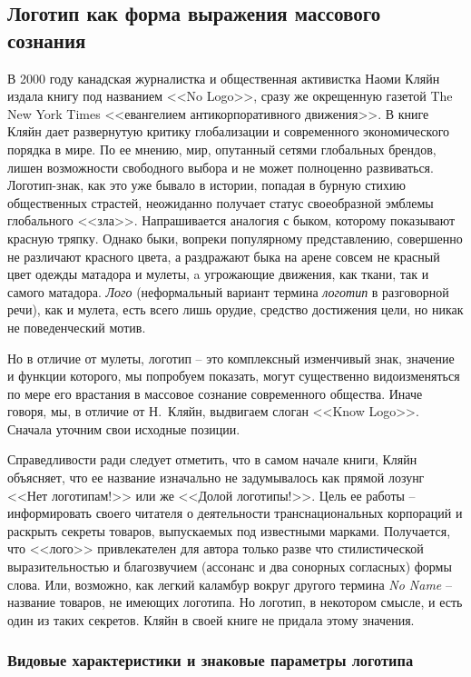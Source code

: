 \subsection{Логотип как форма выражения массового сознания}
\label{1.3}

В 2000 году канадская журналистка и общественная активистка Наоми Кляйн
издала книгу под названием <<No Logo>>, сразу же окрещенную газетой
The New York Times <<евангелием антикорпоративного движения>>. В книге Кляйн дает
развернутую критику глобализации и современного экономического порядка в мире.
По ее мнению, мир, опутанный сетями глобальных брендов, лишен возможности свободного
выбора и не может полноценно развиваться.
Логотип-знак, как это уже бывало в истории,  попадая в бурную стихию общественных
страстей, неожиданно получает статус своеобразной эмблемы глобального <<зла>>.
Напрашивается аналогия с быком, которому показывают красную тряпку. Однако быки,
вопреки популярному представлению, совершенно не различают красного цвета,
а раздражают быка на арене совсем не красный цвет одежды матадора и мулеты,
a угрожающие движения, как ткани, так и самого матадора.
\emph{Лого} (неформальный вариант термина \emph{логотип} в разговорной речи),
как и мулета, есть всего лишь орудие, средство достижения цели,
но никак не поведенческий мотив.

Но в отличие от мулеты, логотип -- это комплексный изменчивый знак, значение и
функции которого, мы попробуем показать, могут существенно видоизменяться по мере
его врастания в массовое сознание современного общества. Иначе говоря, мы, в
отличие от Н.~Кляйн, выдвигаем слоган <<Know Logo>>. Сначала уточним свои исходные
позиции.

Справедливости ради следует отметить, что в самом начале книги, Кляйн объясняет,
что  ее название изначально не задумывалось как прямой лозунг <<Нет логотипам!>> или
же <<Долой логотипы!>>. Цель ее работы -- информировать своего читателя о деятельности
транснациональных корпораций и раскрыть секреты товаров, выпускаемых
под известными марками.\autocite{klein2003}
Получается, что <<лого>> привлекателен для автора только разве что стилистической
выразительностью и благозвучием (ассонанс и два сонорных согласных) формы слова.
Или, возможно, как легкий каламбур вокруг другого термина \emph{No Name} --
название товаров, не имеющих логотипа.  Но логотип, в некотором смысле, и есть
один из таких секретов. Кляйн в своей книге не придала этому значения.

\subsubsection{Видовые характеристики и знаковые параметры логотипа}

